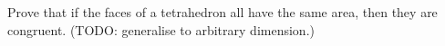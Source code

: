 Prove that if the faces of a tetrahedron all have the same area, then they are congruent.
\newline (TODO: generalise to arbitrary dimension.)
